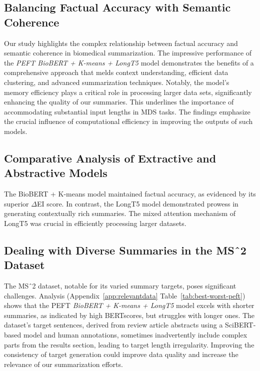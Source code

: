 \documentclass[11pt]{article}
\begin{document}
\subsection{Balancing Factual Accuracy with Semantic Coherence}

Our study highlights the complex relationship between factual accuracy and semantic coherence in biomedical summarization. The impressive performance of the \textit{PEFT BioBERT + K-means + LongT5} model demonstrates the benefits of a comprehensive approach that melds context understanding, efficient data clustering, and advanced summarization techniques. Notably, the model's memory efficiency plays a critical role in processing larger data sets, significantly enhancing the quality of our summaries. This underlines the importance of accommodating substantial input lengths in MDS tasks. The findings emphasize the crucial influence of computational efficiency in improving the outputs of such models.

\subsection{Comparative Analysis of Extractive and Abstractive Models}

The BioBERT + K-means model maintained factual accuracy, as evidenced by its superior $\Delta$EI score. In contrast, the LongT5 model demonstrated prowess in generating contextually rich summaries. The mixed attention mechanism of LongT5 was crucial in efficiently processing larger datasets.

\subsection{Dealing with Diverse Summaries in the MSˆ2 Dataset}

The MSˆ2 dataset, notable for its varied summary targets, poses significant challenges. Analysis (Appendix~\ref{app:relevantdata} Table~\ref{tab:best-worst-peft}) shows that the PEFT \textit{BioBERT + K-means + LongT5} model excels with shorter summaries, as indicated by high BERTscores, but struggles with longer ones. The dataset's target sentences, derived from review article abstracts using a SciBERT-based model and human annotations, sometimes inadvertently include complex parts from the results section, leading to target length irregularity. Improving the consistency of target generation could improve data quality and increase the relevance of our summarization efforts.
\end{document}
